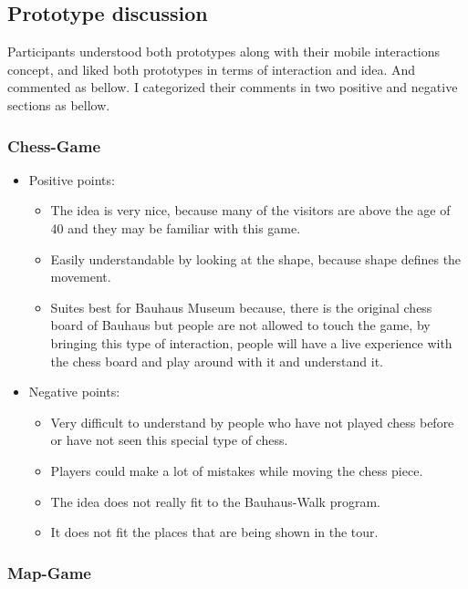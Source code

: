 \subsection{Prototype discussion}
Participants understood both prototypes along with their mobile interactions concept, and liked both prototypes in terms of interaction and idea. And commented as bellow. I categorized their comments in two positive and negative sections as bellow.

\subsubsection{Chess-Game}

\begin {itemize}

\item{Positive points:} 

\begin {itemize}
\item	The idea is very nice, because many of the visitors are above the age of 40 and they may be familiar with this game.
\item	Easily understandable by looking at the shape, because shape defines the movement. 
\item	Suites best for Bauhaus Museum because, there is the original chess board of Bauhaus but people are not allowed to touch the game, by bringing this type of interaction, people will have a live experience with the chess board and play around with it and understand it.

\end {itemize}

\item{Negative points:} \
\begin {itemize}
\item	Very difficult to understand by people who have not played chess before or have not seen this special type of chess.
\item	Players could make a lot of mistakes while moving the chess piece. 
\item	The idea does not really fit to the Bauhaus-Walk program.
\item	It does not fit the places that are being shown in the tour.
\end {itemize}
\end {itemize}

\subsubsection{Map-Game}

